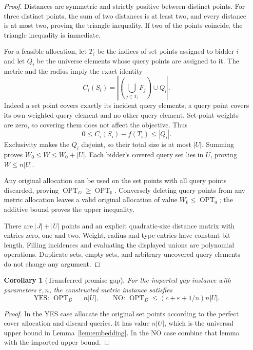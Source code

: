 \documentclass[11pt]{article}
\newtheorem{corollary}[theorem]{Corollary}
\newcommand{\OPT}{\operatorname{OPT}}
\begin{document}
\begin{proof}
Distances are symmetric and strictly positive between distinct points. For three distinct points, the sum of two distances is at least two, and every distance is at most two, proving the triangle inequality. If two of the points coincide, the triangle inequality is immediate.

For a feasible allocation, let $T_i$ be the indices of set points assigned to bidder $i$ and let $Q_i$ be the universe elements whose query points are assigned to it. The metric and the radius imply the exact identity
\[
 C_i(S_i)=\left|\left(\bigcup_{j\in T_i}F_j\right)\cup Q_i\right|.
\]
Indeed a set point covers exactly its incident query elements; a query point covers its own weighted query element and no other query element. Set-point weights are zero, so covering them does not affect the objective. Thus
\[
 0\le C_i(S_i)-f(T_i)\le |Q_i|.
\]
Exclusivity makes the $Q_i$ disjoint, so their total size is at most $|U|$. Summing proves $W_0\le W\le W_0+|U|$. Each bidder's covered query set lies in $U$, proving $W\le n|U|$.

Any original allocation can be used on the set points with all query points discarded, proving $\OPT_D\ge\OPT_0$. Conversely deleting query points from any metric allocation leaves a valid original allocation of value $W_0\le\OPT_0$; the additive bound proves the upper inequality.

There are $|J|+|U|$ points and an explicit quadratic-size distance matrix with entries zero, one and two. Weight, radius and type entries have constant bit length. Filling incidences and evaluating the displayed unions are polynomial operations. Duplicate sets, empty sets, and arbitrary uncovered query elements do not change any argument.
\end{proof}

\begin{corollary}[Transferred promise gap]\label{cor:gap}
For the imported gap instance with parameters $\varepsilon,n$, the constructed metric instance satisfies
\[
 \text{YES: }\OPT_D=n|U|,\qquad
 \text{NO: }\OPT_D\le(c+\varepsilon+1/n)n|U|.
\]
\end{corollary}
\begin{proof}
In the YES case allocate the original set points according to the perfect cover allocation and discard queries. It has value $n|U|$, which is the universal upper bound in Lemma~\ref{lem:embedding}. In the NO case combine that lemma with the imported upper bound.
\end{proof}
\end{document}
